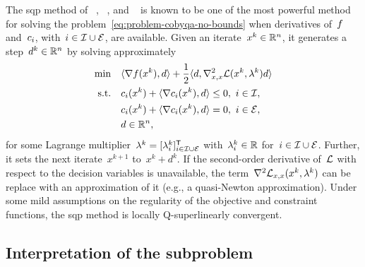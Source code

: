 The \gls{sqp} method of \citeauthor{Wilson_1963}~\cite{Wilson_1963}, \citeauthor{Han_1976}~\cite{Han_1976,Han_1977}, and \citeauthor{Powell_1978a}~\cite{Powell_1978a,Powell_1978b} is known to be one of the most powerful method for solving the problem~\cref{eq:problem-cobyqa-no-bounds} when derivatives of~$f$ and~$c_{i}$, with~$i \in \mathcal{I} \cup \mathcal{E}$, are available.
Given an iterate~$x^k \in \mathbb{R}^n$, it generates a step~$d^k \in \mathbb{R}^n$ by solving approximately
\begin{subequations}
    \label{eq:sqp-subproblem}
    \begin{align}
        \min        & \quad \inner{\nabla \obj(x^k), d} + \frac{1}{2} \inner{d, \nabla_{x, x}^2 \lag(x^k, \lambda^k) d} \label{eq:sqp-subproblem-obj}\\
        \text{s.t.} & \quad \con{i}(x^k) + \inner{\nabla \con{i}(x^k), d} \le 0, ~ i \in \iub,\\
                    & \quad \con{i}(x^k) + \inner{\nabla \con{i}(x^k), d} = 0, ~ i \in \ieq,\\
                    & \quad d \in \R^n,
    \end{align}
\end{subequations}
for some Lagrange multiplier~$\lambda^k = [\lambda_i^k]_{i \in \mathcal{I} \cup \mathcal{E}}^{\mathsf{T}}$ with~$\lambda_i^k \in \mathbb{R}$ for~$i \in \mathcal{I} \cup \mathcal{E}$.
Further, it sets the next iterate~$x^{k + 1}$ to~$x^k + d^k$.
If the second-order derivative of~$\lag$ with respect to the decision variables is unavailable, the term~$\nabla^2 \lag_{x, x}(x^k, \lambda^k)$ can be replace with an approximation of it (e.g., a quasi-Newton approximation).
Under some mild assumptions on the regularity of the objective and constraint functions, the \gls{sqp} method is locally Q-superlinearly convergent.

\subsection{Interpretation of the subproblem}


